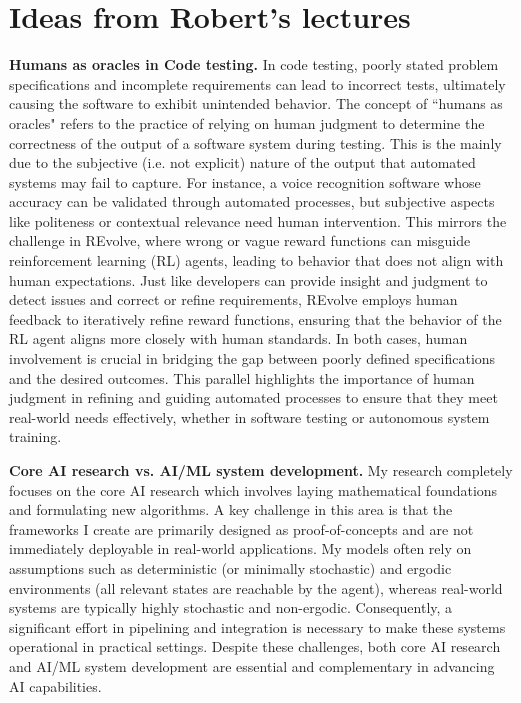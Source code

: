 \documentclass[11pt]{article}
\begin{document}
\section*{Ideas from Robert's lectures}
\textbf{Humans as oracles in Code testing.} In code testing, poorly stated problem specifications and incomplete requirements can lead to incorrect tests, ultimately causing the software to exhibit unintended behavior. The concept of ``humans as oracles" refers to the practice of relying on human judgment to determine the correctness of the output of a software system during testing. This is the mainly due to the subjective (i.e. not explicit) nature of the output that automated systems may fail to capture. For instance, a voice recognition software whose accuracy can be validated through automated processes, but subjective aspects like politeness or contextual relevance need human intervention. This mirrors the challenge in REvolve, where wrong or vague reward functions can misguide reinforcement learning (RL) agents, leading to behavior that does not align with human expectations. Just like developers can provide insight and judgment to detect issues and correct or refine requirements, REvolve employs human feedback to iteratively refine reward functions, ensuring that the behavior of the RL agent aligns more closely with human standards. In both cases, human involvement is crucial in bridging the gap between poorly defined specifications and the desired outcomes. This parallel highlights the importance of human judgment in refining and guiding automated processes to ensure that they meet real-world needs effectively, whether in software testing or autonomous system training. 

\hspace{-6mm}\textbf{Core AI research vs. AI/ML system development.}
My research completely focuses on the core AI research which involves laying mathematical foundations and formulating new algorithms. A key challenge in this area is that the frameworks I create are primarily designed as proof-of-concepts and are not immediately deployable in real-world applications. My models often rely on assumptions such as deterministic (or minimally stochastic) and ergodic environments (all relevant states are reachable by the agent), whereas real-world systems are typically highly stochastic and non-ergodic. Consequently, a significant effort in pipelining and integration is necessary to make these systems operational in practical settings. Despite these challenges, both core AI research and AI/ML system development are essential and complementary in advancing AI capabilities.
\end{document}
